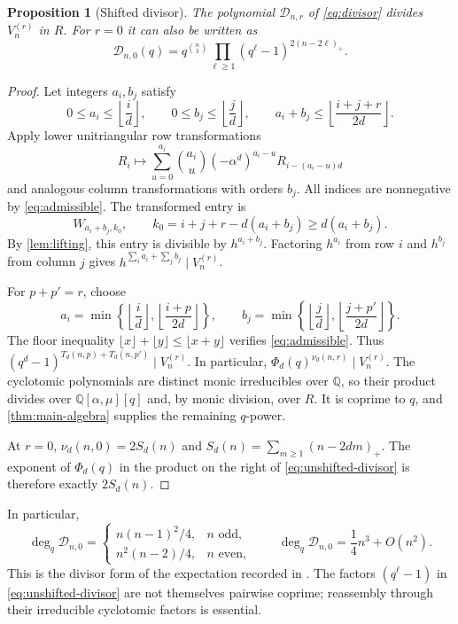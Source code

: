 \documentclass[11pt]{article}
\numberwithin{equation}{section}
\newtheorem{proposition}[proposition]{Proposition}
\theoremstyle{definition}
\theoremstyle{remark}
\newcommand{\Q}{\mathbb{Q}}
\newcommand{\degq}{\operatorname{deg}_q}
\newcommand{\DD}{\mathcal{D}}
\newcommand{\fl}[1]{\left\lfloor#1\right\rfloor}
\begin{document}
\begin{proposition}[Shifted divisor]\label{prop:divisor}
The polynomial $\DD_{n,r}$ of \eqref{eq:divisor} divides $V_n^{(r)}$ in $R$.
For $r=0$ it can also be written as
\begin{equation}\label{eq:unshifted-divisor}
 \DD_{n,0}(q)=q^{\binom n3}
 \prod_{\ell\ge1}(q^\ell-1)^{2(n-2\ell)_+}.
\end{equation}
\end{proposition}
\begin{proof}
Let integers $a_i,b_j$ satisfy
\begin{equation}\label{eq:admissible}
 0\le a_i\le\fl{\frac i d},\qquad
 0\le b_j\le\fl{\frac j d},\qquad
 a_i+b_j\le\fl{\frac{i+j+r}{2d}}.
\end{equation}
Apply lower unitriangular row transformations
\[
 R_i\longmapsto\sum_{u=0}^{a_i}\binom{a_i}{u}
 (-\alpha^d)^{a_i-u}R_{i-(a_i-u)d}
\]
and analogous column transformations with orders $b_j$.
All indices are nonnegative by \eqref{eq:admissible}. The transformed
entry is
\[
 W_{a_i+b_j,k_0},\qquad k_0=i+j+r-d(a_i+b_j)\ge d(a_i+b_j).
\]
By \cref{lem:lifting}, this entry is divisible by $h^{a_i+b_j}$.
Factoring $h^{a_i}$ from row $i$ and $h^{b_j}$ from column $j$ gives
$h^{\sum_i a_i+\sum_j b_j}\mid V_n^{(r)}$.

For $p+p'=r$, choose
\[
 a_i=\min\left\{\fl{\frac i d},\fl{\frac{i+p}{2d}}\right\},\qquad
 b_j=\min\left\{\fl{\frac j d},\fl{\frac{j+p'}{2d}}\right\}.
\]
The floor inequality $\lfloor x\rfloor+\lfloor y\rfloor\le\lfloor x+y\rfloor$
verifies \eqref{eq:admissible}. Thus
$(q^d-1)^{T_d(n,p)+T_d(n,p')}\mid V_n^{(r)}$.
In particular, $\Phi_d(q)^{\nu_d(n,r)}\mid V_n^{(r)}$.
The cyclotomic polynomials are distinct monic irreducibles over $\Q$,
so their product divides over $\Q[\alpha,\mu][q]$ and, by monic division,
over $R$. It is coprime to $q$, and \cref{thm:main-algebra} supplies the
remaining $q$-power.

At $r=0$, $\nu_d(n,0)=2S_d(n)$ and
$S_d(n)=\sum_{m\ge1}(n-2dm)_+$.
The exponent of $\Phi_d(q)$ in the product on the right of
\eqref{eq:unshifted-divisor} is therefore exactly $2S_d(n)$.
\end{proof}

In particular,
\begin{equation}\label{eq:unshifted-degree}
 \degq\DD_{n,0}=
 \begin{cases}
 n(n-1)^2/4,&n\text{ odd},\\
 n^2(n-2)/4,&n\text{ even},
 \end{cases}
 \qquad \degq\DD_{n,0}=\frac14n^3+O(n^2).
\end{equation}
This is the divisor form of the expectation recorded in
\cite[Remark 7]{KRVZ}. The factors $(q^\ell-1)$ in
\eqref{eq:unshifted-divisor} are not themselves pairwise coprime;
reassembly through their irreducible cyclotomic factors is essential.
\end{document}

